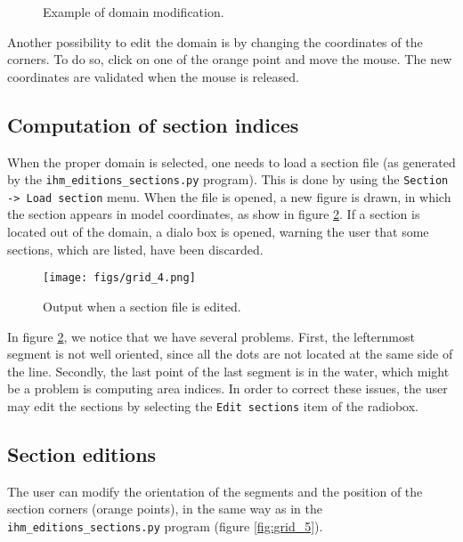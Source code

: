 \begin{figure}[htp]
  \centering
  \caption{Example of domain modification.}
  \label{fig:grid_3}
  \label{fig:contour}
\end{figure}

Another possibility to edit the domain is by changing the coordinates
of the corners. To do so, click on one of the orange point and move
the mouse. The new coordinates are validated when the mouse is
released.

\subsection{Computation of section indices}

When the proper domain is selected, one needs to load a section file
(as generated by the \verb+ihm_editions_sections.py+ program). This is
done by using the \verb+Section -> Load section+ menu. When the file
is opened, a new figure is drawn, in which the section appears in
model coordinates, as show in figure \ref{fig:grid_4}. If a section is located out of the domain, a dialo box is opened,
warning the user that some sections, which are listed, have been discarded.

\begin{figure}[h!]
\centering
\texttt{[image: figs/grid\_4.png]}
\caption{Output when a section file is edited.}
\label{fig:grid_4}
\end{figure}

In figure \ref{fig:grid_4}, we notice that we have several problems. First, the
lefternmost segment is not well oriented, since all the dots are not
located at the same side of the line. Secondly, the last point of the
last segment is in the water, which might be a problem is computing
area indices. In order to correct these issues, the user may edit the
sections by selecting the \verb+Edit sections+ item of the
radiobox. 

\subsection{Section editions}

The user can modify the orientation of the segments and the
position of the section corners (orange points), in the same way as in the
\verb+ihm_editions_sections.py+ program (figure \ref{fig:grid_5}).

